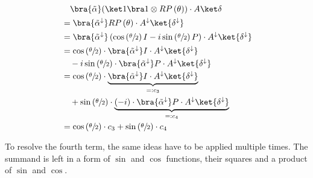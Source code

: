 \begin{equation}
    \label{eq:single-prob-simplification2}
    \begin{split}
            &\quad \bra{\tilde\alpha} (\ket 1 \bra 1 \otimes RP\left(\theta\right)) \cdot A \ket\delta \\
            &= \bra{\tilde\alpha^\downarrow} RP\left(\theta\right) \cdot A^\downarrow \ket{\delta^\downarrow} \\
            &= \bra{\tilde\alpha^\downarrow} \left(\cos\left(\sfrac\theta2\right) I - i \sin\left(\sfrac\theta2\right) P\right) \cdot A^\downarrow \ket{\delta^\downarrow} \\
            &= \cos\left(\sfrac\theta2\right) \cdot \bra{\tilde\alpha^\downarrow} I \cdot A^\downarrow \ket{\delta^\downarrow} \\
                &\quad - i \sin\left(\sfrac\theta2\right) \cdot \bra{\tilde\alpha^\downarrow} P \cdot A^\downarrow \ket{\delta^\downarrow} \\
            &= \cos\left(\sfrac\theta2\right) \cdot \underbrace{\bra{\tilde\alpha^\downarrow} I \cdot A^\downarrow \ket{\delta^\downarrow}}_{=: c_3} \\
                &\quad + \sin\left(\sfrac\theta2\right) \cdot \underbrace{\left(-i\right)\cdot \bra{\tilde\alpha^\downarrow} P \cdot A^\downarrow \ket{\delta^\downarrow}}_{=: c_4} \\
            &= \cos\left(\sfrac\theta2\right) \cdot c_3 + \sin\left(\sfrac\theta2\right) \cdot c_4
    \end{split}
\end{equation}

To resolve the fourth term, the same ideas have to be applied multiple times.
The summand is left in a form of $\sin$ and $\cos$ functions, their squares
and a product of $\sin$ and $\cos$. 

